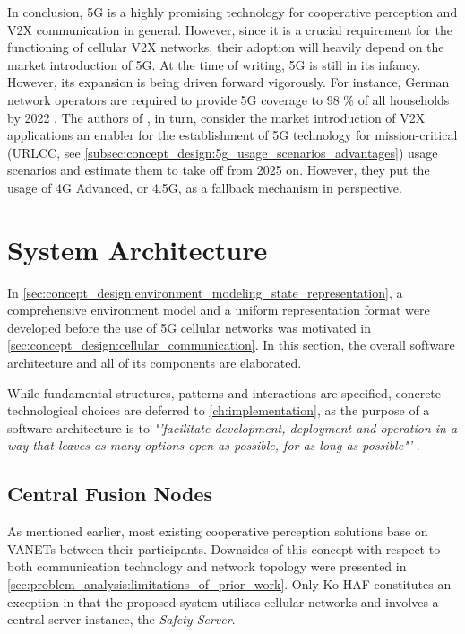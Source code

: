 In conclusion, 5G is a highly promising technology for cooperative perception and V2X communication in general. However, since it is a crucial requirement for the functioning of cellular V2X networks, their adoption will heavily depend on the market introduction of 5G. At the time of writing, 5G is still in its infancy. However, its expansion is being driven forward vigorously. For instance, German network operators are required to provide 5G coverage to 98 \% of all households by 2022 \cite{DeutscheWelle2019}. The authors of \cite{CCSInsight2018}, in turn, consider the market introduction of V2X applications an enabler for the establishment of 5G technology for mission-critical (URLCC, see \cref{subsec:concept_design:5g_usage_scenarios_advantages}) usage scenarios and estimate them to take off from 2025 on. However, they put the usage of 4G Advanced, or 4.5G, as a fallback mechanism in perspective.

\section{System Architecture}
\label{sec:concept_design:system_architecture}
In \cref{sec:concept_design:environment_modeling_state_representation}, a comprehensive environment model and a uniform representation format were developed before the use of 5G cellular networks was motivated in \cref{sec:concept_design:cellular_communication}. In this section, the overall software architecture and all of its components are elaborated.

While fundamental structures, patterns and interactions are specified, concrete technological choices are deferred to \cref{ch:implementation}, as the purpose of a software architecture is to \textit{"'facilitate development, deployment and operation in a way that leaves as many options open as possible, for as long as possible"'} \cite{Martin2017}.

\subsection{Central Fusion Nodes}
\label{subsec:concept_design:central_fusion_nodes}
As mentioned earlier, most existing cooperative perception solutions base on VANETs between their participants. Downsides of this concept with respect to both communication technology and network topology were presented in \cref{sec:problem_analysis:limitations_of_prior_work}. Only Ko-HAF \cite{Hohm2019} constitutes an exception in that the proposed system utilizes cellular networks and involves a central server instance, the \textit{Safety Server}.

